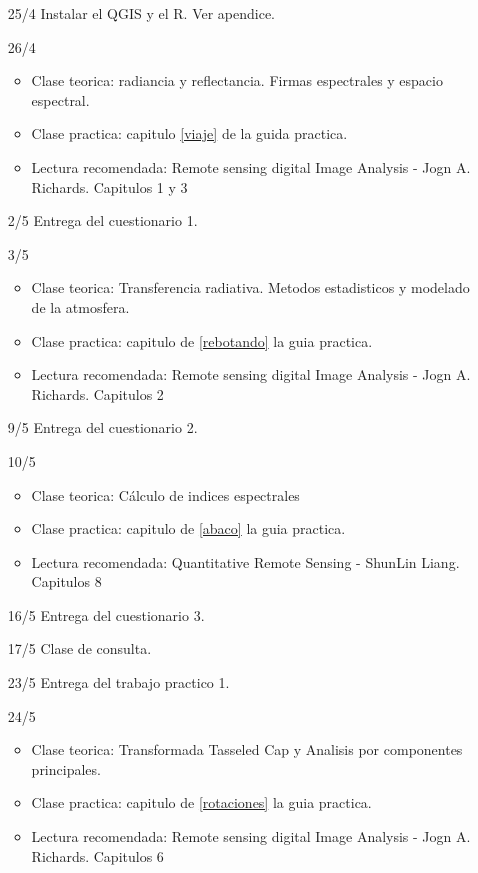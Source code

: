 \begin{itemize}
  \item[25/4] Instalar el QGIS y el R. Ver apendice.
  \item[26/4] 
  \begin{itemize}
    \item Clase teorica: radiancia y reflectancia. Firmas espectrales y espacio espectral.
    \item Clase practica: capitulo \ref{viaje} de la guida practica.
    \item Lectura recomendada: Remote sensing digital Image Analysis - Jogn A. Richards. Capitulos 1 y 3
  \end{itemize}
  \item[2/5] Entrega del cuestionario 1.
  \item[3/5] 
  \begin{itemize}
    \item Clase teorica: Transferencia radiativa. Metodos estadisticos y modelado de la atmosfera.
    \item Clase practica: capitulo de \ref{rebotando} la guia practica.
    \item Lectura recomendada: Remote sensing digital Image Analysis - Jogn A. Richards. Capitulos 2
  \end{itemize}
  \item[9/5] Entrega del cuestionario 2.
  \item[10/5] 
  \begin{itemize}
    \item Clase teorica: C\'alculo de indices espectrales
    \item Clase practica: capitulo de \ref{abaco} la guia practica.
    \item Lectura recomendada: Quantitative Remote Sensing - ShunLin Liang. Capitulos 8
  \end{itemize}
  \item[16/5] Entrega del cuestionario 3.
  \item[17/5] Clase de consulta.
  \item[23/5] Entrega del trabajo practico 1.
  \item[24/5] 
  \begin{itemize}
    \item Clase teorica: Transformada Tasseled Cap y Analisis por componentes principales.
    \item Clase practica: capitulo de \ref{rotaciones} la guia practica.
    \item Lectura recomendada: Remote sensing digital Image Analysis - Jogn A. Richards. Capitulos 6

\end{itemize}
\end{itemize}
